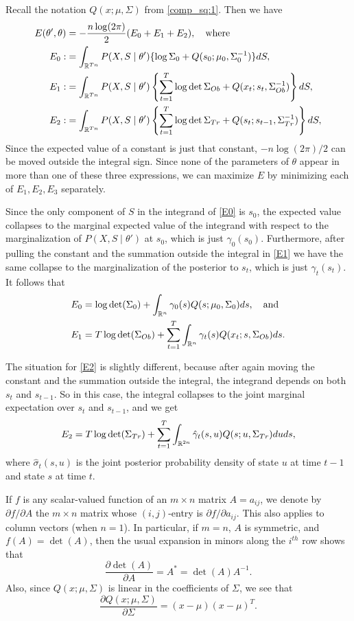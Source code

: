 \documentclass[12pt,leqno]{article}
\begin{document}
  
Recall the notation $Q(x;\mu,\Sigma)$ from \eqref{comp_sq:1}.  Then we have
\begin{align}
  E(\theta',\theta) &= -\frac{n\log(2\pi)}{2}(E_0 + E_1 + E_2),\quad\text{where}\notag\\
  E_0 :&= \int_{{\mathbb R}^{Tn}}P(X,S\mid\theta')\{\log{\Sigma_0} + Q(s_0;\mu_0,\Sigma_0^{-1})\}dS,\label{E0}\\
  E_1 :&= \int_{{\mathbb R}^{Tn}}P(X,S\mid\theta')\left\{\sum_{t=1}^T\log\det\Sigma_{Ob} + Q(x_t;s_t,\Sigma_{Ob}^{-1})\right\}dS,
\label{E1}\\
  E_2 :&= \int_{{\mathbb R}^{Tn}}P(X,S\mid\theta')\left\{\sum_{t=1}^T\log\det\Sigma_{Tr} + Q(s_t;s_{t-1},\Sigma_{Tr}^{-1})\right\}dS,
\label{E2}
\end{align}
Since the expected value of a constant is just that constant, $-n\log(2\pi)/2$ can be moved outside the
integral sign.  Since none of the parameters of $\theta$ appear in more than one of these three expressions,
we can maximize $E$ by minimizing each of $E_1,E_2,E_3$ separately.

Since the only component of $S$ in the integrand of \eqref{E0} is $s_0$, the expected value collapses to the marginal 
expected value of the integrand with respect to the marginalization of $P(X,S\mid\theta')$ at $s_0$, which is just 
$\gamma_0(s_0)$.  Furthermore, after pulling the constant and the summation 
outside the integral in \eqref{E1} we have the same collapse to the marginalization of the posterior to $s_t$, which
is just $\gamma_t(s_t)$.  It follows that
\begin{align*}
E_0 &= \log\det(\Sigma_0) + \int_{{\mathbb R}^n}\gamma_0(s)Q(s;\mu_0,\Sigma_0)ds,\quad\text{and}\\
E_1 &= T\log\det(\Sigma_{Ob}) + \sum_{t=1}^T\int_{{\mathbb R}^n}\gamma_t(s)Q(x_t;s,\Sigma_{Ob})ds.
\end{align*}

The situation for \eqref{E2} is slightly different, because after again moving the constant and the summation outside
the integral, the integrand depends on both $s_t$ and $s_{t-1}$.  So in this case, the integral collapses to the 
joint marginal expectation over $s_t$ and $s_{t-1}$, and we get
$$
E_2 = T\log\det(\Sigma_{Tr}) + \sum_{t=1}^T\int_{{\mathbb R}^{2n}}\hat{\gamma}_t(s,u)Q(s;u,\Sigma_{Tr})duds,
$$
where $\hat{\sigma}_t(s,u)$ is the joint posterior probability density of state $u$ at time $t-1$ and state $s$ 
at time $t$.

If $f$ is any scalar-valued function of an $m\times{n}$ matrix $A = a_{ij}$, we denote by $\partial{f}/\partial{A}$ the 
$m\times{n}$ matrix whose $(i,j)$-entry is $\partial{f}/\partial{a_{ij}}$.  This also applies to column vectors (when $n=1$).
In particular, if $m=n$, $A$ is symmetric, and $f(A) = \det(A)$,  then the usual expansion 
in minors along the $i^{th}$ row shows that 
$$
\frac{\partial{\det(A)}}{\partial{A}} = A^* = \det(A)A^{-1}.
$$
Also, since $Q(x;\mu,\Sigma)$ is linear in the coefficients of $\Sigma$, we see that
$$
\frac{\partial{Q(x;\mu,\Sigma)}}{\partial{\Sigma}} = (x-\mu)(x-\mu)^T.
$$
\end{document}
